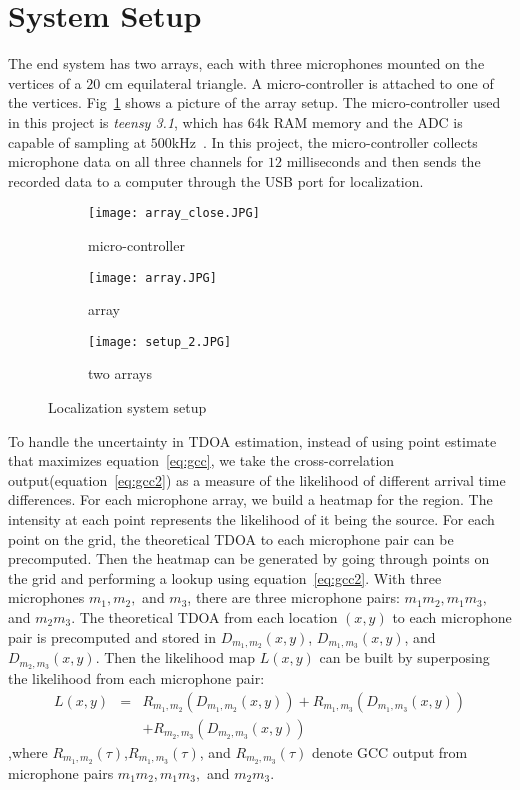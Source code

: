 \section{System Setup}
The end system has two arrays, each with three microphones mounted on the vertices of a $20$ cm equilateral triangle. A micro-controller is attached to one of the vertices. Fig~\ref{fig:setup_array} shows a picture of the array setup. The micro-controller used in this project is \emph{teensy 3.1}, which has $64$k RAM memory and the ADC is capable of sampling at $500$kHz~\cite{tdoa:micloc, sys:teensy}. In this project, the micro-controller collects microphone data on all three channels for $12$ milliseconds and then sends the recorded data to a computer through the USB port for localization. 

\begin{figure}[]
  \centering
  \begin{subfigure}[]{.23\textwidth}
    \texttt{[image: array\_close.JPG]}
    \caption{micro-controller}
  \end{subfigure}
  \begin{subfigure}[]{.23\textwidth}
    \texttt{[image: array.JPG]}
    \caption{array}
  \end{subfigure}
  \begin{subfigure}[]{.23\textwidth}
    \texttt{[image: setup\_2.JPG]}
    \caption{two arrays}
  \end{subfigure}
  \caption{Localization system setup}
  \label{fig:setup_array}
\end{figure}

To handle the uncertainty in TDOA estimation, instead of using point estimate that maximizes equation~\ref{eq:gcc}, we take the cross-correlation output(equation~\ref{eq:gcc2}) as a measure of the likelihood of different arrival time differences. For each microphone array, we build a heatmap for the region. The intensity at each point represents the likelihood of it being the source. For each point on the grid, the theoretical TDOA to each microphone pair can be precomputed. Then the heatmap can be generated by going through points on the grid and performing a lookup using equation~\ref{eq:gcc2}. With three microphones $m_1,m_2,$ and $m_3$, there are three microphone pairs: $m_1m_2,m_1m_3,$ and $m_2m_3$. The theoretical TDOA from each location $(x,y)$ to each microphone pair is precomputed and stored in $D_{m_1,m_2}(x,y)$, $D_{m_1,m_3}(x,y)$, and $D_{m_2,m_3}(x,y)$. Then the likelihood map $L(x,y)$ can be built by superposing the likelihood from each microphone pair:
\begin{eqnarray*}
L(x,y) &=& R_{m_1,m_2}(D_{m_1,m_2}(x,y)) + R_{m_1,m_3}(D_{m_1,m_3}(x,y)) \\
 & & +R_{m_2,m_3}(D_{m_2,m_3}(x,y)) 
\end{eqnarray*}
,where $R_{m_1,m_2}(\tau)$,$R_{m_1,m_3}(\tau)$, and $R_{m_2,m_3}(\tau)$ denote GCC output from microphone pairs $m_1m_2,m_1m_3,$ and $m_2m_3$.

